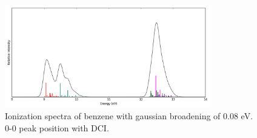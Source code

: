 \documentclass{article}
\begin{document}
\begin{figure}[h!]
    \centering
    \includegraphics[width=0.8\textwidth]{DCI.png}
    \caption{Ionization spectra of benzene with gaussian broadening of 0.08 eV. 0-0 peak position with DCI.}
\end{figure}

\FloatBarrier

~\\~\\





\end{document}
